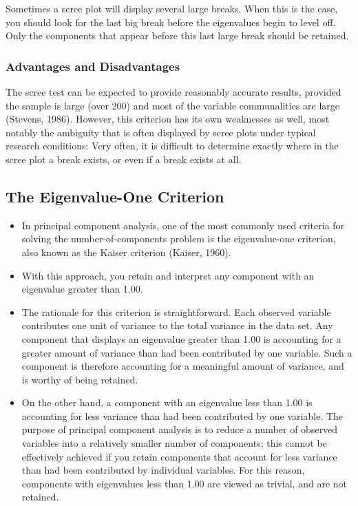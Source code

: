 \documentclass[a4paper,12pt]{article}
\begin{document}
Sometimes a scree plot will display several large breaks.  When this is the case, you should look
for the last big break before the eigenvalues begin to level off. Only the components that appear
before this last large break should be retained.

\subsubsection{Advantages and Disadvantages}
The scree test can be expected to provide reasonably accurate results, provided the sample is
large (over 200) and most of the variable communalities are large (Stevens, 1986).  However,
this criterion has its own weaknesses as well, most notably the ambiguity that is often displayed
by scree plots under typical research conditions:  Very often, it is difficult to determine exactly
where in the scree plot a break exists, or even if a break exists at all.

\subsection{The Eigenvalue-One Criterion} 
\begin{itemize}
	\item In principal component analysis, one of the most commonly
	used criteria for solving the number-of-components problem is the eigenvalue-one criterion, also
	known as the Kaiser criterion (Kaiser, 1960).  
	\item With this approach, you retain and interpret any
	component with an eigenvalue greater than 1.00.
	
	\item 	The rationale for this criterion is straightforward.  Each observed variable contributes one unit of
	variance to the total variance in the data set.  Any component that displays an eigenvalue greater
	than 1.00 is accounting  for a greater amount of variance than had been contributed by one
	variable.  Such a component is therefore accounting for a meaningful amount of variance, and is
	worthy of being retained.
	
	\item 	On the other hand, a component with an eigenvalue less than 1.00 is accounting for less variance
	than had been contributed by one variable.  The purpose of principal component analysis is to
	reduce a number of observed variables into a relatively smaller number of components; this
	cannot be effectively achieved if you retain components that account for less variance than had
	been contributed by individual variables.  For this reason, components with eigenvalues less than
	1.00 are viewed as trivial, and are not retained.
\end{itemize} 
\end{document}
